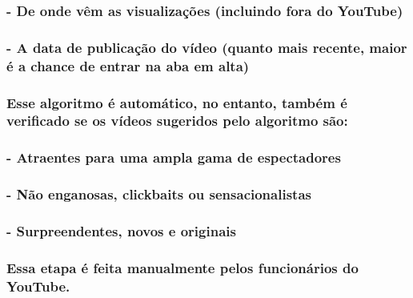 \documentclass[]{article}
\begin{document}
\hypertarget{de-onde-vem-as-visualizacoes-incluindo-fora-do-youtube}{%
\subsubsection{- De onde vêm as visualizações (incluindo fora do
YouTube)}\label{de-onde-vem-as-visualizacoes-incluindo-fora-do-youtube}}

\hypertarget{a-data-de-publicacao-do-video-quanto-mais-recente-maior-e-a-chance-de-entrar-na-aba-em-alta}{%
\subsubsection{- A data de publicação do vídeo (quanto mais recente,
maior é a chance de entrar na aba em
alta)}\label{a-data-de-publicacao-do-video-quanto-mais-recente-maior-e-a-chance-de-entrar-na-aba-em-alta}}

\hypertarget{esse-algoritmo-e-automatico-no-entanto-tambem-e-verificado-se-os-videos-sugeridos-pelo-algoritmo-sao}{%
\subsubsection{Esse algoritmo é automático, no entanto, também é
verificado se os vídeos sugeridos pelo algoritmo
são:}\label{esse-algoritmo-e-automatico-no-entanto-tambem-e-verificado-se-os-videos-sugeridos-pelo-algoritmo-sao}}

\hypertarget{atraentes-para-uma-ampla-gama-de-espectadores}{%
\subsubsection{- Atraentes para uma ampla gama de
espectadores}\label{atraentes-para-uma-ampla-gama-de-espectadores}}

\hypertarget{nao-enganosas-clickbaits-ou-sensacionalistas}{%
\subsubsection{- Não enganosas, clickbaits ou
sensacionalistas}\label{nao-enganosas-clickbaits-ou-sensacionalistas}}

\hypertarget{surpreendentes-novos-e-originais}{%
\subsubsection{- Surpreendentes, novos e
originais}\label{surpreendentes-novos-e-originais}}

\hypertarget{essa-etapa-e-feita-manualmente-pelos-funcionarios-do-youtube.}{%
\subsubsection{Essa etapa é feita manualmente pelos funcionários do
YouTube.}\label{essa-etapa-e-feita-manualmente-pelos-funcionarios-do-youtube.}}
\end{document}
